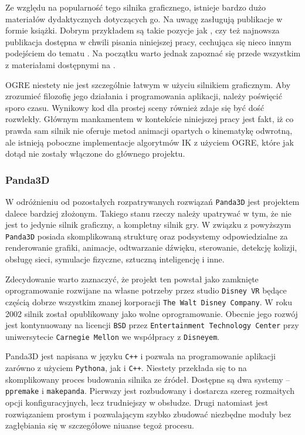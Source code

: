\documentclass[11pt]{mwrep}
\begin{document}
      Ze względu na popularność tego silnika graficznego, istnieje bardzo dużo materiałów dydaktycznych dotyczących go. Na uwagę zasługują publikacje w formie książki. Dobrym przykładem są takie pozycje jak \cite{ogreb1}, czy też najnowsza publikacja dostępna w chwili pisania niniejszej pracy, cechująca się nieco innym podejściem do tematu \cite{ogreb2}. Na początku warto jednak zapoznać się przede wszystkim z materiałami dostępnymi na \cite{ogre}.

      OGRE niestety nie jest szczególnie łatwym w użyciu silnikiem graficznym. Aby zrozumieć filozofię jego działania i programowania aplikacji, należy poświęcić sporo czasu. Wynikowy kod dla prostej sceny również zdaje się być dość rozwlekły. Głównym mankamentem w kontekście niniejszej pracy jest fakt, iż co prawda sam silnik nie oferuje metod animacji opartych o kinematykę odwrotną, ale istnieją poboczne implementacje algorytmów IK z użyciem OGRE, które jak dotąd nie zostały włączone do głównego projektu.

      \subsubsection{Panda3D}

      W odróżnieniu od pozostałych rozpatrywanych rozwiązań \texttt{Panda3D} jest projektem dalece bardziej złożonym. Takiego stanu rzeczy należy upatrywać w tym, że nie jest to jedynie silnik graficzny, a kompletny silnik gry. W związku z powyższym \texttt{Panda3D} posiada skomplikowaną strukturę oraz podsystemy odpowiedzialne za renderowanie grafiki, animacje, odtwarzanie dźwięku, sterowanie, detekcję kolizji, obsługę sieci, symulacje fizyczne, sztuczną inteligencję i inne.

      Zdecydowanie warto zaznaczyć, że projekt ten powstał jako zamknięte oprogramowanie rozwijane na własne potrzeby przez studio \texttt{Disney VR} będące częścią dobrze wszystkim znanej korporacji \texttt{The Walt Disney Company}. W roku 2002 silnik został opublikowany jako wolne oprogramowanie. Obecnie jego rozwój jest kontynuowany na licencji \texttt{BSD} przez \texttt{Entertainment Technology Center} przy uniwersytecie \texttt{Carnegie Mellon} we współpracy z \texttt{Disneyem}.

      Panda3D jest napisana w języku \texttt{C++} i pozwala na programowanie aplikacji zarówno z użyciem \texttt{Pythona}, jak i \texttt{C++}. Niestety przekłada się to na skomplikowany proces budowania silnika ze źródeł. Dostępne są dwa systemy -- \texttt{ppremake} i \texttt{makepanda}. Pierwszy jest rozbudowany i dostarcza szereg rozmaitych opcji konfiguracyjnych, lecz trudniejszy w obsłudze. Drugi natomiast jest rozwiązaniem prostym i pozwalającym szybko zbudować niezbędne moduły bez zagłębiania się w szczegółowe niuanse tegoż procesu.
\end{document}
